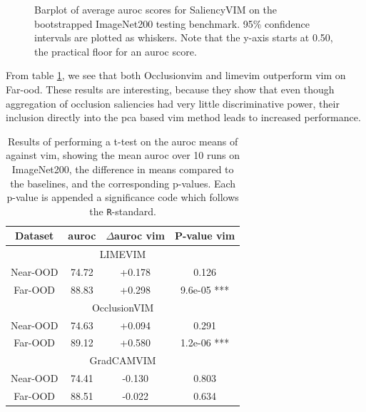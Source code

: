 \documentclass[UKenglish]{uiomasterthesis} %
\theoremstyle{definition}
\begin{document}
\begin{figure}[H]
    \begin{center}
        
    \end{center}
    \caption[ImageNet200 SaliencyVIM Bootstrap]{Barplot of average \ac{auroc} scores for SaliencyVIM on the bootstrapped ImageNet200 testing benchmark. 95\% confidence intervals are plotted as whiskers. Note that the y-axis starts at 0.50, the practical floor for an \ac{auroc} score.}
    \label{fig:imagenet200_salvim_bootstrap_barplot}
\end{figure}

From table \ref{table:imagenet200_salvim_ttest}, we see that both Occlusion\ac{vim} and \ac{lime}\ac{vim} outperform \ac{vim} on Far-\ac{ood}. These results are interesting, because they show that even though aggregation of occlusion saliencies had very little discriminative power, their inclusion directly into the \ac{pca} based \ac{vim} method leads to increased performance.

\begin{table}[H]
\setlength\tabcolsep{3pt}
\begin{center}
\begin{tabular}{ |c|c|c|c| }
    \hline
    Dataset & \ac{auroc} & $\Delta$\ac{auroc} \ac{vim} & P-value \ac{vim} \\
    \hline
    \hline
    \multicolumn{4}{|c|}{LIMEVIM} \\
    \hline
    \rowcolor{near!50}
    Near-OOD & 74.72 & +0.178 & 0.126 \\
    \rowcolor{far!50}
    Far-OOD & 88.83 & +0.298 & 9.6e-05 *** \\
    \hline
    \hline
    \multicolumn{4}{|c|}{OcclusionVIM} \\
    \hline
    \rowcolor{near!50}
    Near-OOD & 74.63 & +0.094 & 0.291 \\
    \rowcolor{far!50}
    Far-OOD & 89.12 & +0.580 & 1.2e-06 *** \\
    \hline
    \hline
    \multicolumn{4}{|c|}{GradCAMVIM} \\
    \hline
    \rowcolor{near!50}
    Near-OOD & 74.41 & -0.130 & 0.803 \\
    \rowcolor{far!50}
    Far-OOD & 88.51 & -0.022 & 0.634 \\
    \hline
    \end{tabular}
    \caption[]{Results of performing a t-test on the \ac{auroc} means of against \ac{vim}, showing the mean \ac{auroc} over 10 runs on ImageNet200, the difference in means compared to the baselines, and the corresponding p-values. Each p-value is appended a significance code which follows the \texttt{R}-standard.}
    \label{table:imagenet200_salvim_ttest}
\end{center}
\setlength\tabcolsep{6pt}
\end{table}
\end{document}
